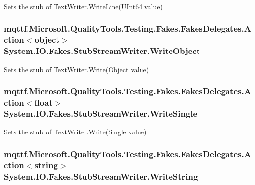 Sets the stub of Text\-Writer.\-Write\-Line(\-U\-Int64 value)

\hypertarget{class_system_1_1_i_o_1_1_fakes_1_1_stub_stream_writer_aaf6149f8ab7b37d8dcabfb12544b87cb}{
\subsubsection[{Write\-Object}]{\setlength{\rightskip}{0pt plus 5cm}mqttf.\-Microsoft.\-Quality\-Tools.\-Testing.\-Fakes.\-Fakes\-Delegates.\-Action$<$object$>$ System.\-I\-O.\-Fakes.\-Stub\-Stream\-Writer.\-Write\-Object}}\label{class_system_1_1_i_o_1_1_fakes_1_1_stub_stream_writer_aaf6149f8ab7b37d8dcabfb12544b87cb}


Sets the stub of Text\-Writer.\-Write(\-Object value)

\hypertarget{class_system_1_1_i_o_1_1_fakes_1_1_stub_stream_writer_a961299701726d147742d262974ada80b}{
\subsubsection[{Write\-Single}]{\setlength{\rightskip}{0pt plus 5cm}mqttf.\-Microsoft.\-Quality\-Tools.\-Testing.\-Fakes.\-Fakes\-Delegates.\-Action$<$float$>$ System.\-I\-O.\-Fakes.\-Stub\-Stream\-Writer.\-Write\-Single}}\label{class_system_1_1_i_o_1_1_fakes_1_1_stub_stream_writer_a961299701726d147742d262974ada80b}


Sets the stub of Text\-Writer.\-Write(\-Single value)

\hypertarget{class_system_1_1_i_o_1_1_fakes_1_1_stub_stream_writer_a3a70f7c25dfa3c74ae49a39bd556af68}{
\subsubsection[{Write\-String}]{\setlength{\rightskip}{0pt plus 5cm}mqttf.\-Microsoft.\-Quality\-Tools.\-Testing.\-Fakes.\-Fakes\-Delegates.\-Action$<$string$>$ System.\-I\-O.\-Fakes.\-Stub\-Stream\-Writer.\-Write\-String}}\label{class_system_1_1_i_o_1_1_fakes_1_1_stub_stream_writer_a3a70f7c25dfa3c74ae49a39bd556af68}



